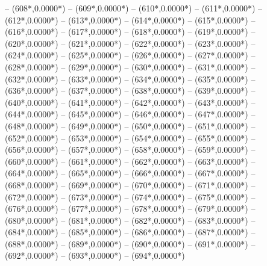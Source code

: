 {		-- ({608*\dx},{0.0000*\dy})
		-- ({609*\dx},{0.0000*\dy})
		-- ({610*\dx},{0.0000*\dy})
		-- ({611*\dx},{0.0000*\dy})
		-- ({612*\dx},{0.0000*\dy})
		-- ({613*\dx},{0.0000*\dy})
		-- ({614*\dx},{0.0000*\dy})
		-- ({615*\dx},{0.0000*\dy})
		-- ({616*\dx},{0.0000*\dy})
		-- ({617*\dx},{0.0000*\dy})
		-- ({618*\dx},{0.0000*\dy})
		-- ({619*\dx},{0.0000*\dy})
		-- ({620*\dx},{0.0000*\dy})
		-- ({621*\dx},{0.0000*\dy})
		-- ({622*\dx},{0.0000*\dy})
		-- ({623*\dx},{0.0000*\dy})
		-- ({624*\dx},{0.0000*\dy})
		-- ({625*\dx},{0.0000*\dy})
		-- ({626*\dx},{0.0000*\dy})
		-- ({627*\dx},{0.0000*\dy})
		-- ({628*\dx},{0.0000*\dy})
		-- ({629*\dx},{0.0000*\dy})
		-- ({630*\dx},{0.0000*\dy})
		-- ({631*\dx},{0.0000*\dy})
		-- ({632*\dx},{0.0000*\dy})
		-- ({633*\dx},{0.0000*\dy})
		-- ({634*\dx},{0.0000*\dy})
		-- ({635*\dx},{0.0000*\dy})
		-- ({636*\dx},{0.0000*\dy})
		-- ({637*\dx},{0.0000*\dy})
		-- ({638*\dx},{0.0000*\dy})
		-- ({639*\dx},{0.0000*\dy})
		-- ({640*\dx},{0.0000*\dy})
		-- ({641*\dx},{0.0000*\dy})
		-- ({642*\dx},{0.0000*\dy})
		-- ({643*\dx},{0.0000*\dy})
		-- ({644*\dx},{0.0000*\dy})
		-- ({645*\dx},{0.0000*\dy})
		-- ({646*\dx},{0.0000*\dy})
		-- ({647*\dx},{0.0000*\dy})
		-- ({648*\dx},{0.0000*\dy})
		-- ({649*\dx},{0.0000*\dy})
		-- ({650*\dx},{0.0000*\dy})
		-- ({651*\dx},{0.0000*\dy})
		-- ({652*\dx},{0.0000*\dy})
		-- ({653*\dx},{0.0000*\dy})
		-- ({654*\dx},{0.0000*\dy})
		-- ({655*\dx},{0.0000*\dy})
		-- ({656*\dx},{0.0000*\dy})
		-- ({657*\dx},{0.0000*\dy})
		-- ({658*\dx},{0.0000*\dy})
		-- ({659*\dx},{0.0000*\dy})
		-- ({660*\dx},{0.0000*\dy})
		-- ({661*\dx},{0.0000*\dy})
		-- ({662*\dx},{0.0000*\dy})
		-- ({663*\dx},{0.0000*\dy})
		-- ({664*\dx},{0.0000*\dy})
		-- ({665*\dx},{0.0000*\dy})
		-- ({666*\dx},{0.0000*\dy})
		-- ({667*\dx},{0.0000*\dy})
		-- ({668*\dx},{0.0000*\dy})
		-- ({669*\dx},{0.0000*\dy})
		-- ({670*\dx},{0.0000*\dy})
		-- ({671*\dx},{0.0000*\dy})
		-- ({672*\dx},{0.0000*\dy})
		-- ({673*\dx},{0.0000*\dy})
		-- ({674*\dx},{0.0000*\dy})
		-- ({675*\dx},{0.0000*\dy})
		-- ({676*\dx},{0.0000*\dy})
		-- ({677*\dx},{0.0000*\dy})
		-- ({678*\dx},{0.0000*\dy})
		-- ({679*\dx},{0.0000*\dy})
		-- ({680*\dx},{0.0000*\dy})
		-- ({681*\dx},{0.0000*\dy})
		-- ({682*\dx},{0.0000*\dy})
		-- ({683*\dx},{0.0000*\dy})
		-- ({684*\dx},{0.0000*\dy})
		-- ({685*\dx},{0.0000*\dy})
		-- ({686*\dx},{0.0000*\dy})
		-- ({687*\dx},{0.0000*\dy})
		-- ({688*\dx},{0.0000*\dy})
		-- ({689*\dx},{0.0000*\dy})
		-- ({690*\dx},{0.0000*\dy})
		-- ({691*\dx},{0.0000*\dy})
		-- ({692*\dx},{0.0000*\dy})
		-- ({693*\dx},{0.0000*\dy})
		-- ({694*\dx},{0.0000*\dy})
}
